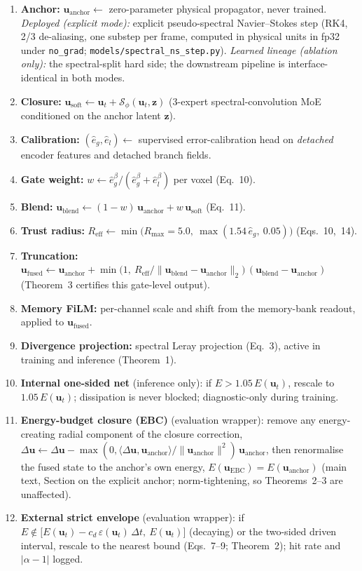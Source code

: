 \documentclass[11pt,a4paper]{article}
\newcommand{\bu}{\bm{u}}
\newcommand{\Ex}{E}
\begin{document}
\begin{enumerate}
\item \textbf{Anchor:} $\bu_{\mathrm{anchor}}\leftarrow$ zero-parameter physical propagator, never trained. \emph{Deployed (explicit mode):} explicit pseudo-spectral Navier--Stokes step (RK4, 2/3 de-aliasing, one substep per frame, computed in physical units in fp32 under \texttt{no\_grad}; \texttt{models/spectral\_ns\_step.py}). \emph{Learned lineage (ablation only):} the spectral-split hard side; the downstream pipeline is interface-identical in both modes.
\item \textbf{Closure:} $\bu_{\mathrm{soft}}\leftarrow\bu_t+\mathcal{S}_\phi(\bu_t,\bm{z})$ (3-expert spectral-convolution MoE conditioned on the anchor latent $\bm{z}$).
\item \textbf{Calibration:} $(\hat e_g,\hat e_l)\leftarrow$ supervised error-calibration head on \emph{detached} encoder features and detached branch fields.
\item \textbf{Gate weight:} $w\leftarrow\hat e_g^{\beta}/(\hat e_g^{\beta}+\hat e_l^{\beta})$ per voxel (Eq.~10).
\item \textbf{Blend:} $\bu_{\mathrm{blend}}\leftarrow(1-w)\,\bu_{\mathrm{anchor}}+w\,\bu_{\mathrm{soft}}$ (Eq.~11).
\item \textbf{Trust radius:} $R_{\mathrm{eff}}\leftarrow\min\!\big(R_{\max}{=}5.0,\ \max(1.54\,\hat e_g,\ 0.05)\big)$ (Eqs.~10,~14).
\item \textbf{Truncation:} $\bu_{\mathrm{fused}}\leftarrow\bu_{\mathrm{anchor}}+\min\!\big(1,\ R_{\mathrm{eff}}/\|\bu_{\mathrm{blend}}-\bu_{\mathrm{anchor}}\|_2\big)\,(\bu_{\mathrm{blend}}-\bu_{\mathrm{anchor}})$ (Theorem~3 certifies this gate-level output).
\item \textbf{Memory FiLM:} per-channel scale and shift from the memory-bank readout, applied to $\bu_{\mathrm{fused}}$.
\item \textbf{Divergence projection:} spectral Leray projection (Eq.~3), active in training and inference (Theorem~1).
\item \textbf{Internal one-sided net} (inference only): if $\Ex>\!1.05\,\Ex(\bu_t)$, rescale to $1.05\,\Ex(\bu_t)$; dissipation is never blocked; diagnostic-only during training.
\item \textbf{Energy-budget closure (EBC)} (evaluation wrapper): remove any energy-creating radial component of the closure correction, $\Delta\bu\leftarrow\Delta\bu-\max(0,\langle\Delta\bu,\bu_{\mathrm{anchor}}\rangle/\|\bu_{\mathrm{anchor}}\|^2)\,\bu_{\mathrm{anchor}}$, then renormalise the fused state to the anchor's own energy, $\Ex(\bu_{\mathrm{EBC}})=\Ex(\bu_{\mathrm{anchor}})$ (main text, Section on the explicit anchor; norm-tightening, so Theorems~2--3 are unaffected).
\item \textbf{External strict envelope} (evaluation wrapper): if $\Ex\notin\big[\Ex(\bu_t)-c_d\,\varepsilon(\bu_t)\,\Delta t,\ \Ex(\bu_t)\big]$ (decaying) or the two-sided driven interval, rescale to the nearest bound (Eqs.~7--9; Theorem~2); hit rate and $|\alpha-1|$ logged.
\end{enumerate}
\end{document}
